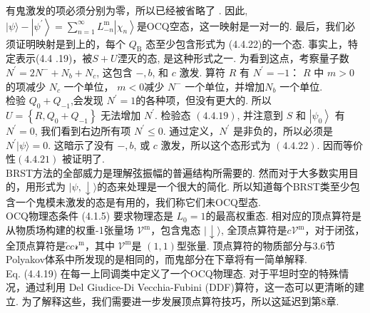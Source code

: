 有鬼激发的项必须分别为零，所以已经被省略了 . 因此, $|\psi\rangle-\left|\psi^{\prime}\right\rangle=\sum_{n=1}^{\infty} L_{-n}^{\mathrm{m}}\left|\chi_{n}\right\rangle$是OCQ空态，这一映射是一对一的. 最后，我们必须证明映射是到上的，每个 $Q_{\mathrm{B}}$ 态至少包含形式为 (4.4.22)的一个态. 事实上，特定表示(4.4 .19)，被$S+U$湮灭的态, 是这种形式之一. 为看到这点，考察量子数 $N^{\prime}=2 N^{-}+N_{b}+N_{c}$, 这包含 $-, b$, 和 $c$ 激发. 算符 $R$ 有 $N^{\prime}=-1$： $R$ 中 $m>0$ 的项减少 $N_{c}$ 一个单位， $m<0$减少 $N^{-}$ 一个单位，并增加$N_{b}$ 一个单位. \\
检验 $Q_{0}+Q_{-1}$,会发现 $N^{\prime}=1$的各种项，但没有更大的. 所以 $U=\left\{R, Q_{0}+Q_{-1}\right\}$ 无法增加 $N^{\prime}$. 检验态 $(4.4 .19)$, 并注意到 $S$ 和 $\left|\psi_{0}\right\rangle$ 有 $N^{\prime}=0$, 我们看到右边所有项 $N^{\prime} \leq 0 $.  通过定义，$N^{\prime}$ 是非负的，所以必须是 $N^{\prime}|\psi\rangle=0 $.  这暗示了没有 $-, b$, 或 $c$ 激发，所以这个态形式为 $(4.4.22)$. 因而等价性$(4.4 .21)$ 被证明了.\\
BRST方法的全部威力是理解弦振幅的普遍结构所需要的. 然而对于大多数实用目的，用形式为 $|\psi, \downarrow\rangle$的态来处理是一个很大的简化. 所以知道每个BRST类至少包含一个鬼模未激发的态是有用的，我们称它们未OCQ型态.\\
OCQ物理态条件 (4.1.5) 要求物理态是 $L_{0}=1$的最高权重态. 相对应的顶点算符是从物质场构建的权重-1张量场 $\mathscr{V}^{\mathrm{m}}$，包含鬼态 $|\downarrow\rangle$, 全顶点算符是$c \mathscr{V}^{\mathrm{m}} $，对于闭弦，全顶点算符是$\tilde{c} c \mathscr{r}^{\mathrm{m}}$，其中 $\mathscr{V}^{\mathrm{m}}$是  $(1,1)$型张量. 顶点算符的物质部分与3.6节Polyakov体系中所发现的是相同的，而鬼部分在下章将有一简单解释.\\
Eq. (4.4.19) 在每一上同调类中定义了一个OCQ物理态. 对于平坦时空的特殊情况，通过利用 Del Giudice-Di Vecchia-Fubini (DDF)算符，这一态可以更清晰的建立. 为了解释这些，我们需要进一步发展顶点算符技巧，所以这延迟到第8章.\\